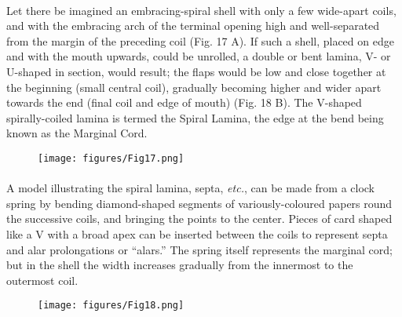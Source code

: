 \documentclass[a4paper, 12pt, oneside]{article}
\begin{document}
\paragraph{}
Let there be imagined an embracing-spiral shell with only a few wide-apart coils, and with the embracing arch of the terminal opening high and well-separated from the margin of the preceding coil (Fig. 17 A). If such a shell, placed on edge and with the mouth upwards, could be unrolled, a double or bent lamina, V- or U-shaped in section, would result; the flaps would be low and close together at the beginning (small central coil), gradually becoming higher and wider apart towards the end (final coil and edge of mouth) (Fig. 18 B). The V-shaped spirally-coiled lamina is termed the Spiral Lamina, the edge at the bend being known as the Marginal Cord.
\begin{figure}[H]
\centering
\texttt{[image: figures/Fig17.png]}
\caption*{}
\end{figure}
\paragraph{}
A model illustrating the spiral lamina, septa, \emph{etc.}, can be made from a clock spring by bending diamond-shaped segments of variously-coloured papers round the successive coils, and bringing the points to the center. Pieces of card shaped like a V with a broad apex can be inserted between the coils to represent septa and alar prolongations or ``alars.'' The spring itself represents the marginal cord; but in the shell the width increases gradually from the innermost to the outermost coil.
\begin{figure}[H]
\centering
\texttt{[image: figures/Fig18.png]}
\caption*{}
\end{figure}
\end{document}
